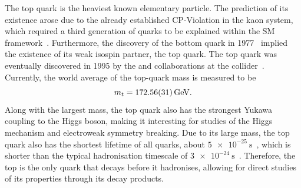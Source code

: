 The top quark is the heaviest known elementary particle. The prediction of its existence arose due to the already established CP-Violation in the kaon system, which required a third generation of quarks to be explained within the SM framework~\cite{kobayashi_maskawa}. Furthermore, the discovery of the bottom quark in 1977~\cite{bottom_discovery} implied the existence of its weak isospin partner, the top quark. The top quark was eventually discovered in 1995 by the \cdf and \dzero collaborations at the \tevatron collider~\cite{top_discovery_cdf,top_discovery_d0}.
Currently, the world average of the top-quark mass is measured to be~\cite{PDG2024}
\begin{equation}
  m_t = \qty{172.56 \pm 0.31}{\giga\electronvolt}.
\end{equation}
Along with the largest mass, the top quark also has the strongest Yukawa coupling to the Higgs boson, making it interesting for studies of the Higgs mechanism and electroweak symmetry breaking.
Due to its large mass, the top quark also has the shortest lifetime of all quarks, about $\qty{5e-25}{\second}$~\cite{PDG2024}, which is shorter than the typical hadronisation timescale of $\qty{3e-24}{\second}$~\cite{hadronization_time_2}. Therefore, the top is the only quark that decays before it hadronises, allowing for direct studies of its properties through its decay products.

